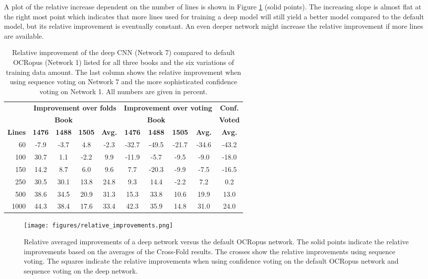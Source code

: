 \documentclass{jlcl}
\begin{document}
A plot of the relative increase dependent on the number of lines is shown in Figure \ref{fig:relative_improvements} (solid points).
The increasing slope is almost flat at the right most point which indicates that more lines used for training a deep model will still yield a better model compared to the default model, but its relative improvement is eventually constant.
An even deeper network might increase the relative improvement if more lines are available.

\begin{table}[t]
    \centering
    \caption{Relative improvement of the deep CNN (Network 7) compared to default OCRopus (Network 1) listed for all three books and the six variations of training data amount.
    The last column shows the relative improvement when using sequence voting on Network 7 and the more sophisticated confidence voting on Network 1.
    All numbers are given in percent.}
    \label{tab:improvements}
    \begin{tabular}{r|ccc|c|ccc|c||c}
        \hline
              & \multicolumn{4}{c|}{\textbf{Improvement over folds}} & \multicolumn{4}{c||}{\textbf{Improvement over voting}} & \textbf{Conf.} \\
              & \multicolumn{3}{c|}{\textbf{Book}} & & \multicolumn{3}{c|}{\textbf{Book}} & & \textbf{Voted} \\
        \textbf{Lines} & \textbf{1476} & \textbf{1488} & \textbf{1505} & \textbf{Avg.} & \textbf{1476} & \textbf{1488} & \textbf{1505} & \textbf{Avg.} & \textbf{Avg.} \\
        \hline
           60 & -7.9 & -3.7 &  4.8 & -2.3 & -32.7 & -49.5 & -21.7 & -34.6 & -43.2 \\
          100 & 30.7 & 1.1  & -2.2 &  9.9 & -11.9 &  -5.7 &  -9.5 &  -9.0 & -18.0 \\
          150 & 14.2 & 8.7  &  6.0 &  9.6 &   7.7 & -20.3 &  -9.9 &  -7.5 & -16.5 \\
          250 & 30.5 & 30.1 & 13.8 & 24.8 &   9.3 &  14.4 &  -2.2 &   7.2 &   0.2 \\
          500 & 38.6 & 34.5 & 20.9 & 31.3 &  15.3 &  33.8 &  10.6 &  19.9 &  13.0 \\
         1000 & 44.3 & 38.4 & 17.6 & 33.4 &  42.3 &  35.9 &  14.8 &  31.0 &  24.0 \\
         \hline
    \end{tabular}
\end{table}


\begin{figure}[t]
    \centering
    \texttt{[image: figures/relative\_improvements.png]}
    \caption{Relative averaged improvements of a deep network versus the default OCRopus network. The solid points indicate the relative improvements based on the averages of the Cross-Fold results.
    The crosses show the relative improvements using sequence voting.
    The squares indicate the relative improvements when using confidence voting on the default OCRopus network and sequence voting on the deep network.}
    \label{fig:relative_improvements}
\end{figure}
\end{document}
